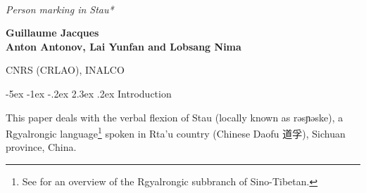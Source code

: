 \documentclass[oldfontcommands,twoside,usletter,12pt]{memoir}
\makeatletter
\newcommand{\ipa}[1]{{\phon #1}} %
\newcommand{\zh}[1]{{\cn #1}}
\newcommand{\titre}{\textit{Himalayan Linguistics, Vol 13(1).} \copyright{}   Himalayan Linguistics 2014\newline ISSN 1544-7502}
\renewcommand\section{\@startsection{section}{0}{\z@}%
                                   {-5ex \@plus -1ex \@minus -.2ex}%
                                   {2.3ex \@plus.2ex}%
                                   {\flushleft\large\bfseries}}
\makeatother
\begin{document}

 
\begin{flushleft}
\renewcommand{\thefootnote}{\fnsymbol{footnote}}
 
{\HUGE\textit{\\Person marking in Stau*}}

\vspace{24pt}
{\large\textbf{Guillaume Jacques\\ Anton Antonov, Lai Yunfan and Lobsang Nima}}

{\large CNRS (CRLAO), INALCO} 
\vspace{14pt}
\end{flushleft}

\renewcommand{\thefootnote}{\fnsymbol{footnote}}
\renewcommand{\thefootnote}{\arabic{footnote}}\setcounter{footnote}{0}
 
 

%
%
 
\section{Introduction}

This paper deals with the verbal flexion of Stau (locally known as \ipa{rəsɲəske}), a Rgyalrongic language\footnote{See \citet{jackson00sidaba} for an overview of the Rgyalrongic subbranch of Sino-Tibetan.} spoken in Rta'u country (Chinese Daofu \zh{道孚}), Sichuan province, China.
\end{document}

